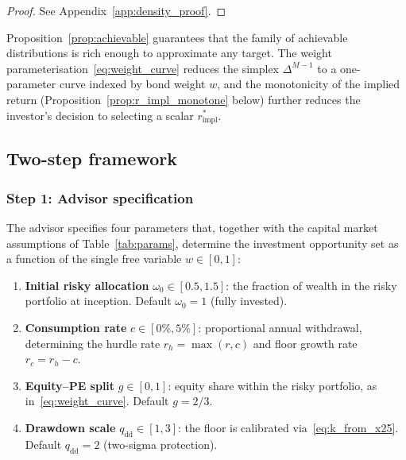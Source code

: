 \documentclass[11pt,a4paper]{article}
\numberwithin{equation}{section}
\begin{document}
\begin{proof}
See Appendix~\ref{app:density_proof}.
\end{proof}

Proposition~\ref{prop:achievable} guarantees that the family of achievable 
distributions is rich enough to approximate any target. The weight 
parameterisation~\eqref{eq:weight_curve} reduces the simplex $\Delta^{M-1}$ 
to a one-parameter curve indexed by bond weight $w$, and the monotonicity 
of the implied return (Proposition~\ref{prop:r_impl_monotone} below) 
further reduces the investor's decision to selecting a scalar 
$r^*_{\mathrm{impl}}$.


\subsection{Two-step framework}\label{sec:two_step}

\subsubsection{Step 1: Advisor specification}\label{sec:advisor_spec}

The advisor specifies four parameters that, together with the capital 
market assumptions of Table~\ref{tab:params}, determine the investment 
opportunity set as a function of the single free variable $w \in [0, 1]$:
\begin{enumerate}[leftmargin=2em]
\item \textbf{Initial risky allocation} $\omega_0 \in [0.5, 1.5]$: the 
fraction of wealth in the risky portfolio at inception. Default 
$\omega_0 = 1$ (fully invested).
\item \textbf{Consumption rate} $c \in [0\%, 5\%]$: proportional annual 
withdrawal, determining the hurdle rate $r_h = \max(r, c)$ and floor 
growth rate $r_c = r_h - c$.
\item \textbf{Equity--PE split} $g \in [0, 1]$: equity share within the 
risky portfolio, as in~\eqref{eq:weight_curve}. Default $g = 2/3$.
\item \textbf{Drawdown scale} $q_{\mathrm{dd}} \in [1, 3]$: the floor 
is calibrated via~\eqref{eq:k_from_x25}. Default $q_{\mathrm{dd}} = 2$ 
(two-sigma protection).
\end{enumerate}
\end{document}
